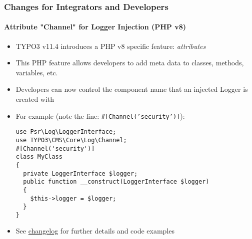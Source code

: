 %

\begin{frame}[fragile]
	\frametitle{Changes for Integrators and Developers}
	\framesubtitle{Attribute "Channel" for Logger Injection (PHP v8)}


	\begin{itemize}
		\item TYPO3 v11.4 introduces a PHP v8 specific feature: \textit{attributes}
		\item This PHP feature allows developers to add meta data to classes,
			methods, variables, etc.
		\item Developers can now control the component name that an injected
			Logger is created with
		\item For example \small(note the line: \texttt{\#[Channel('security')]}):\normalsize
\begin{lstlisting}
use Psr\Log\LoggerInterface;
use TYPO3\CMS\Core\Log\Channel;
#[Channel('security')]
class MyClass
{
  private LoggerInterface $logger;
  public function __construct(LoggerInterface $logger)
  {
    $this->logger = $logger;
  }
}
\end{lstlisting}
		\item See
			\href{https://docs.typo3.org/c/typo3/cms-core/master/en-us/Changelog/11.4/Feature-95079-SupportPHP8StyleChannelAttributeForLoggerInjection.html}{changelog}
			for further details and code examples
	\end{itemize}

\end{frame}

